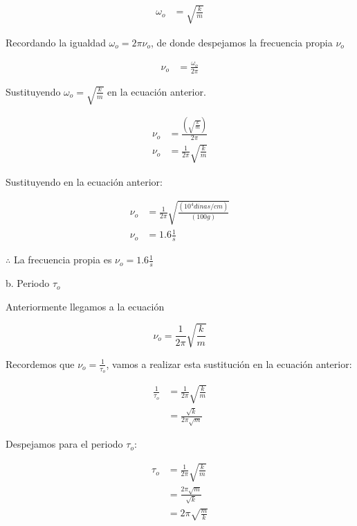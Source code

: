\begin{align*}
    \omega_{o} &= \sqrt{ \frac{k}{m} }
\end{align*}

Recordando la igualdad $ \omega_{o} = 2\pi \nu_{o} $, de donde despejamos
la frecuencia propia $\nu_{o}$

\begin{align*}
    \nu_{o} &= \frac{\omega_{o}}{2\pi}
\end{align*}

Sustituyendo $\omega_{o} = \sqrt{ \frac{k}{m} }$ en la ecuación anterior.

\begin{align*}
    \nu_{o} &= \frac{ \left( \sqrt{ \frac{k}{m} } \right) }{2\pi} \\
    \nu_{o} &= \frac{ 1 }{2\pi} \sqrt{ \frac{k}{m} }
\end{align*}

Sustituyendo en la ecuación anterior:

\begin{align*}
    \nu_{o} &= \frac{ 1 }{2\pi} \sqrt{\frac{( 10^{4} dinas/cm )}{(100 g)}}\\
    \nu_{o} &= 1.6 \frac{1}{s}
\end{align*}

$\therefore$ La frecuencia propia es  $ \nu_{o} = 1.6 \frac{1}{s}$

\vspace*{0.4cm}

b. Periodo  $ \tau_{o}  $

Anteriormente llegamos a la ecuación

\begin{equation*}
    \nu_{o} = \frac{ 1 }{2\pi} \sqrt{ \frac{k}{m} }
\end{equation*}

Recordemos que $\nu_{o}=\frac{1}{\tau_{o}} $, vamos a realizar esta sustitución en la ecuación
anterior:

\begin{align*}
    \frac{1}{\tau_{o}} &= \frac{ 1 }{2\pi} \sqrt{ \frac{k}{m} } \\
                       &= \frac{ \sqrt{k} }{ 2\pi \sqrt{m} }
\end{align*}

Despejamos para el periodo $\tau_{o}$:

\begin{align*}
    \tau_{o}    &= \frac{ 1 }{2\pi} \sqrt{ \frac{k}{m} } \\
                &= \frac{ 2\pi \sqrt{m}  }{ \sqrt{k} } \\
                &= 2\pi \sqrt{ \frac{m}{k} }
\end{align*}

